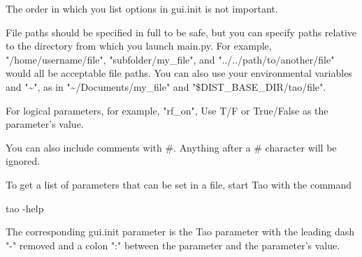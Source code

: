 The order in which you list options in gui.init is not important.

File paths should be specified in full to be safe, but you can specify paths relative to the directory from which you launch main.py.  For example, "/home/username/file", "subfolder/my_file", and "../../path/to/another/file" would all be acceptable file paths.  You can also use your environmental variables and "\textasciitilde{}", as in "\textasciitilde{}/Documents/my_file" and "\$DIST_BASE_DIR/tao/file".

For logical parameters, for example, "rf_on", Use T/F or True/False as the parameter's value.

You can also include comments with \#.  Anything after a \# character will be ignored.

To get a list of parameters that can be set in a  file, start Tao with the command
\begin{example}
  tao -help
\end{example}
The corresponding gui.init parameter is the Tao parameter with the leading dash "-" removed and a
colon ":" between the parameter and the parameter's value. 

